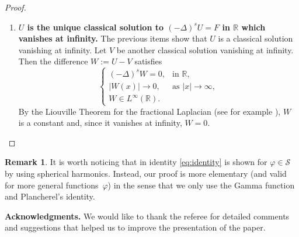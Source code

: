 \documentclass[a4paper,11pt,reqno]{amsart}
\newcommand{\R}{\mathbb{R}}
\theoremstyle{definition}
\newtheorem{rem}[thm]{Remark}
\numberwithin{equation}{section}
\begin{document}
\begin{proof}
\begin{enumerate}[$(1)$]
\item \textbf{$U$ is the unique classical solution to $(-\Delta)^sU=F$ in $\R$ which
vanishes at infinity.} The previous items show that $U$ is a classical solution vanishing at infinity.
Let $V$ be another classical solution vanishing at infinity. Then the difference $W:=U-V$ satisfies
$$
\begin{cases}
(-\Delta)^sW=0, &\text{in } \R, \\
|W(x)|\to0, &\text{as } |x|\to\infty, \\
W\in L^\infty(\R).
\end{cases}
$$
By the Liouville Theorem for the fractional Laplacian (see for example
\cite{Landkof}), $W$ is a constant and, since it vanishes at
infinity, $W=0$.
\end{enumerate}
\end{proof}

\begin{rem}
It is worth noticing that in \cite[p.~117]{StSingular} identity \eqref{eq:identity} is shown for $\varphi\in\mathcal{S}$
by using spherical harmonics.
Instead, our proof is more elementary (and valid for more general functions~$\varphi$)
in the sense that we only use the Gamma function and Plancherel's identity.
\end{rem}

\noindent\textbf{Acknowledgments.} We would like to thank the referee 
for detailed comments and suggestions that helped us to improve the 
presentation of the paper.
\end{document}
